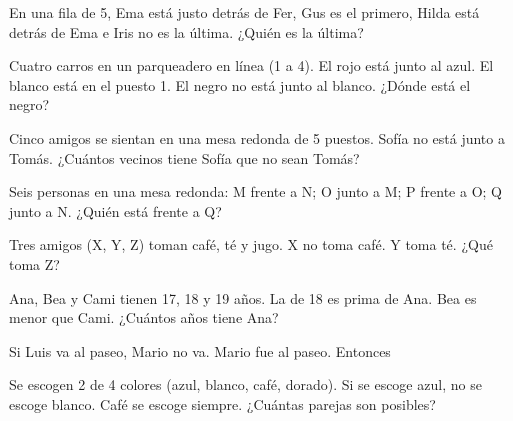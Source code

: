 \evaluacion
\begin{ejercicios}
\item En una fila de 5, Ema está justo detrás de Fer, Gus es el primero, Hilda está detrás de Ema e Iris no es la última. ¿Quién es la última?
\item Cuatro carros en un parqueadero en línea (1 a 4). El rojo está junto al azul. El blanco está en el puesto 1. El negro no está junto al blanco. ¿Dónde está el negro?
\item Cinco amigos se sientan en una mesa redonda de 5 puestos. Sofía no está junto a Tomás. ¿Cuántos vecinos tiene Sofía que no sean Tomás?
\item Seis personas en una mesa redonda: M frente a N; O junto a M; P frente a O; Q junto a N. ¿Quién está frente a Q?
\item Tres amigos (X, Y, Z) toman café, té y jugo. X no toma café. Y toma té. ¿Qué toma Z?
\item Ana, Bea y Cami tienen 17, 18 y 19 años. La de 18 es prima de Ana. Bea es menor que Cami. ¿Cuántos años tiene Ana?
\item Si Luis va al paseo, Mario no va. Mario fue al paseo. Entonces
\item Se escogen 2 de 4 colores (azul, blanco, café, dorado). Si se escoge azul, no se escoge blanco. Café se escoge siempre. ¿Cuántas parejas son posibles?
\end{ejercicios}
